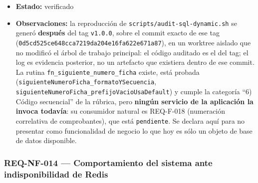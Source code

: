 \documentclass[
  spanish,
]{article}
\begin{document}
\begin{itemize}
  guion \texttt{scripts/\allowbreak{}audit-\allowbreak{}sql-\allowbreak{}dynamic.\allowbreak{}sh} (objetivo
  \texttt{sql-\allowbreak{}audit} del \texttt{Makefile} y job \texttt{sql-\allowbreak{}audit} del
  CI); catálogo \texttt{docs/\allowbreak{}basedatos/\allowbreak{}CATALOGO-\allowbreak{}SP.\allowbreak{}md}; decisión
  \texttt{docs/\allowbreak{}adr/\allowbreak{}ADR-\allowbreak{}007-\allowbreak{}acceso-\allowbreak{}datos.\allowbreak{}md}; requisitos que consumen
  estas rutinas: REQ-F-021, REQ-F-013, REQ-F-015, REQ-F-018, REQ-F-019.
\item
  \textbf{Estado:} verificado
\item
  \textbf{Observaciones:} la reproducción de
  \texttt{scripts/\allowbreak{}audit-\allowbreak{}sql-\allowbreak{}dynamic.\allowbreak{}sh} se generó \textbf{después} del
  tag \texttt{v1.\allowbreak{}0.\allowbreak{}0}, sobre el commit exacto de ese tag
  (\texttt{0d5cd525ce648cca\allowbreak{}7219da204e16fa62\allowbreak{}2e671a87}), en un worktree
  aislado que no modificó el árbol de trabajo principal: el código
  auditado es el del tag; el log es evidencia posterior, no un artefacto
  que existiera dentro de ese commit. La rutina
  \texttt{fn\_\allowbreak{}siguiente\_\allowbreak{}numer\allowbreak{}o\_\allowbreak{}ficha} existe, está probada
  (\texttt{siguiente\allowbreak{}Numero\allowbreak{}Ficha\_\allowbreak{}formato\allowbreak{}YSecuencia},
  \texttt{siguiente\allowbreak{}Numero\allowbreak{}Ficha\_\allowbreak{}prefijo\allowbreak{}Vacio\allowbreak{}Usa\allowbreak{}Default}) y cumple la
  categoría ``6) Código secuencial'' de la rúbrica, pero \textbf{ningún
  servicio de la aplicación la invoca todavía}: su consumidor natural es
  REQ-F-018 (numeración correlativa de comprobantes), que está
  \texttt{pendiente}. Se declara aquí para no presentar como
  funcionalidad de negocio lo que hoy es sólo un objeto de base de datos
  disponible.
\end{itemize}

\subsubsection{REQ-NF-014 --- Comportamiento del sistema ante
indisponibilidad de
Redis}\label{req-nf-014-comportamiento-del-sistema-ante-indisponibilidad-de-redis}
\end{document}
